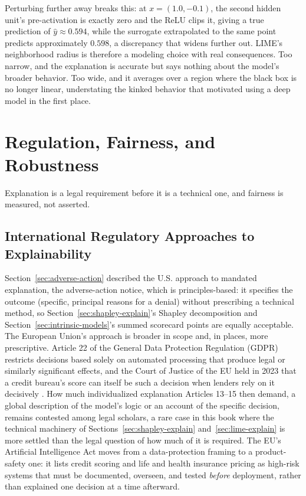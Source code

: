 \documentclass[../ai_in_finance]{subfiles}
\begin{document}
Perturbing further away breaks this: at $x = (1.0, -0.1)$, the second hidden unit's pre-activation is exactly zero and the ReLU clips it, giving a true prediction of $\hat y \approx 0.594$, while the surrogate extrapolated to the same point predicts approximately $0.598$, a discrepancy that widens further out. LIME's neighborhood radius is therefore a modeling choice with real consequences. Too narrow, and the explanation is accurate but says nothing about the model's broader behavior. Too wide, and it averages over a region where the black box is no longer linear, understating the kinked behavior that motivated using a deep model in the first place.

\section{Regulation, Fairness, and Robustness}

Explanation is a legal requirement before it is a technical one, and fairness is measured, not asserted.

\subsection{International Regulatory Approaches to Explainability}
\label{sec:reg-approaches}

Section~\ref{sec:adverse-action} described the U.S. approach to mandated explanation, the adverse-action notice, which is principles-based: it specifies the outcome (specific, principal reasons for a denial) without prescribing a technical method, so Section~\ref{sec:shapley-explain}'s Shapley decomposition and Section~\ref{sec:intrinsic-models}'s summed scorecard points are equally acceptable. The European Union's approach is broader in scope and, in places, more prescriptive. Article 22 of the General Data Protection Regulation (GDPR) restricts decisions based solely on automated processing that produce legal or similarly significant effects, and the Court of Justice of the EU held in 2023 that a credit bureau's score can itself be such a decision when lenders rely on it decisively \parencite{cjeu2023schufa}. How much individualized explanation Articles 13--15 then demand, a global description of the model's logic or an account of the specific decision, remains contested among legal scholars, a rare case in this book where the technical machinery of Sections~\ref{sec:shapley-explain} and~\ref{sec:lime-explain} is more settled than the legal question of how much of it is required. The EU's Artificial Intelligence Act \parencite{eu2024aiact} moves from a data-protection framing to a product-safety one: it lists credit scoring and life and health insurance pricing as high-risk systems that must be documented, overseen, and tested \emph{before} deployment, rather than explained one decision at a time afterward.
\end{document}
